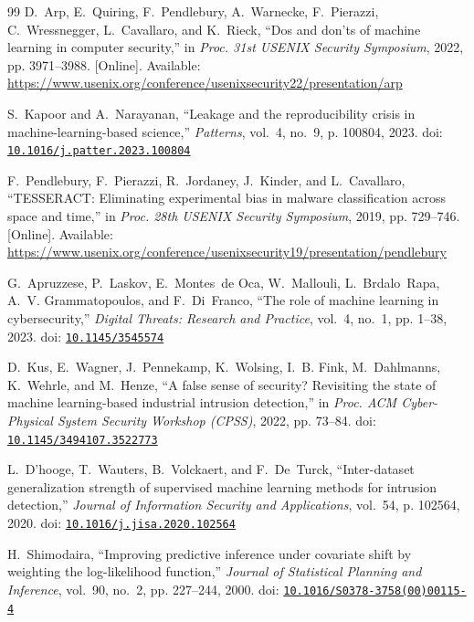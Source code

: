 \begin{thebibliography}{99}
\BIBentryALTinterwordspacing
D.~Arp, E.~Quiring, F.~Pendlebury, A.~Warnecke, F.~Pierazzi, C.~Wressnegger,
  L.~Cavallaro, and K.~Rieck, ``Dos and don'ts of machine learning in computer
  security,'' in \emph{Proc. 31st USENIX Security Symposium}, 2022, pp.
  3971--3988. [Online]. Available:
  \url{https://www.usenix.org/conference/usenixsecurity22/presentation/arp}
\BIBentrySTDinterwordspacing

S.~Kapoor and A.~Narayanan, ``Leakage and the reproducibility crisis in
  machine-learning-based science,'' \emph{Patterns}, vol.~4, no.~9, p. 100804,
  2023. doi:
  \href{https://doi.org/10.1016/j.patter.2023.100804}{\nolinkurl{10.1016/j.patter.2023.100804}}

\BIBentryALTinterwordspacing
F.~Pendlebury, F.~Pierazzi, R.~Jordaney, J.~Kinder, and L.~Cavallaro,
  ``{TESSERACT}: Eliminating experimental bias in malware classification across
  space and time,'' in \emph{Proc. 28th USENIX Security Symposium}, 2019, pp.
  729--746. [Online]. Available:
  \url{https://www.usenix.org/conference/usenixsecurity19/presentation/pendlebury}
\BIBentrySTDinterwordspacing

G.~Apruzzese, P.~Laskov, E.~Montes~de Oca, W.~Mallouli, L.~Brdalo~Rapa, A.~V.
  Grammatopoulos, and F.~Di~Franco, ``The role of machine learning in
  cybersecurity,'' \emph{Digital Threats: Research and Practice}, vol.~4,
  no.~1, pp. 1--38, 2023. doi:
  \href{https://doi.org/10.1145/3545574}{\nolinkurl{10.1145/3545574}}

D.~Kus, E.~Wagner, J.~Pennekamp, K.~Wolsing, I.~B. Fink, M.~Dahlmanns,
  K.~Wehrle, and M.~Henze, ``A false sense of security? {R}evisiting the state
  of machine learning-based industrial intrusion detection,'' in \emph{Proc.
  ACM Cyber-Physical System Security Workshop (CPSS)}, 2022, pp. 73--84. doi:
  \href{https://doi.org/10.1145/3494107.3522773}{\nolinkurl{10.1145/3494107.3522773}}

L.~D'hooge, T.~Wauters, B.~Volckaert, and F.~De~Turck, ``Inter-dataset
  generalization strength of supervised machine learning methods for intrusion
  detection,'' \emph{Journal of Information Security and Applications},
  vol.~54, p. 102564, 2020. doi:
  \href{https://doi.org/10.1016/j.jisa.2020.102564}{\nolinkurl{10.1016/j.jisa.2020.102564}}

H.~Shimodaira, ``Improving predictive inference under covariate shift by
  weighting the log-likelihood function,'' \emph{Journal of Statistical
  Planning and Inference}, vol.~90, no.~2, pp. 227--244, 2000. doi:
  \href{https://doi.org/10.1016/S0378-3758(00)00115-4}{\nolinkurl{10.1016/S0378-3758(00)00115-4}}


\end{thebibliography}
